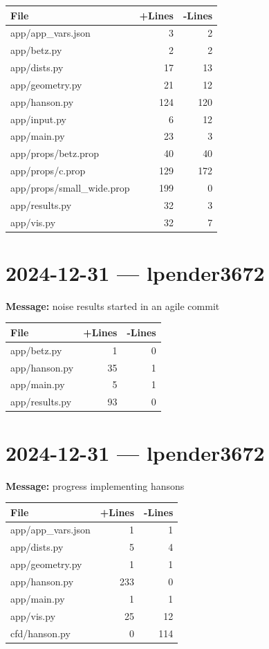 \documentclass{article}
\begin{document}
\begin{longtable}{|p{10cm}|r|r|}
\hline \textbf{File} & \textbf{+Lines} & \textbf{-Lines} \\
\hline
app/app\_vars.json & 3 & 2 \\
\hline
app/betz.py & 2 & 2 \\
\hline
app/dists.py & 17 & 13 \\
\hline
app/geometry.py & 21 & 12 \\
\hline
app/hanson.py & 124 & 120 \\
\hline
app/input.py & 6 & 12 \\
\hline
app/main.py & 23 & 3 \\
\hline
app/props/betz.prop & 40 & 40 \\
\hline
app/props/c.prop & 129 & 172 \\
\hline
app/props/small\_wide.prop & 199 & 0 \\
\hline
app/results.py & 32 & 3 \\
\hline
app/vis.py & 32 & 7 \\
\hline
\end{longtable}

\section*{2024-12-31 --- lpender3672}
\textbf{Message:} noise results started in an agile commit

\begin{longtable}{|p{10cm}|r|r|}
\hline \textbf{File} & \textbf{+Lines} & \textbf{-Lines} \\
\hline
app/betz.py & 1 & 0 \\
\hline
app/hanson.py & 35 & 1 \\
\hline
app/main.py & 5 & 1 \\
\hline
app/results.py & 93 & 0 \\
\hline
\end{longtable}

\section*{2024-12-31 --- lpender3672}
\textbf{Message:} progress implementing hansons

\begin{longtable}{|p{10cm}|r|r|}
\hline \textbf{File} & \textbf{+Lines} & \textbf{-Lines} \\
\hline
app/app\_vars.json & 1 & 1 \\
\hline
app/dists.py & 5 & 4 \\
\hline
app/geometry.py & 1 & 1 \\
\hline
app/hanson.py & 233 & 0 \\
\hline
app/main.py & 1 & 1 \\
\hline
app/vis.py & 25 & 12 \\
\hline
cfd/hanson.py & 0 & 114 \\
\hline
\end{longtable}
\end{document}
